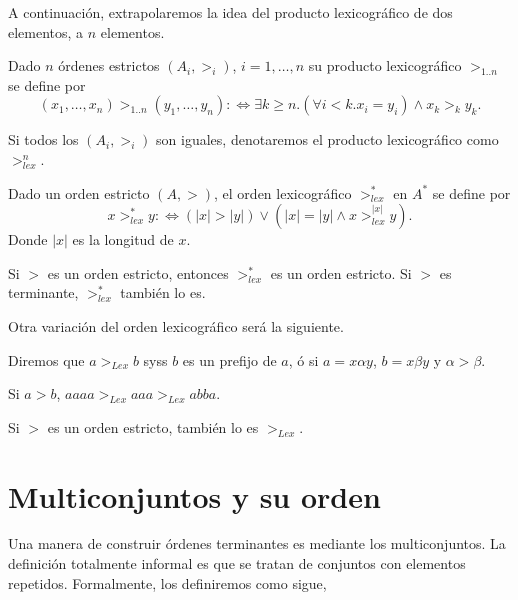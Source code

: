 A continuación, extrapolaremos la idea del producto lexicográfico de dos
elementos, a $n$ elementos.

\begin{defi}
  Dado $n$ órdenes estrictos $(A_i,>_i)$, $i=1,\dots,n$ su producto
  lexicográfico $>_{1..n}$ se define por
  \[(x_1,\dots,x_n) >_{1..n}  (y_1,\dots,y_n) :\Leftrightarrow 
    \exists k \geq n. (\forall i < k. x_i = y_i) \wedge x_k >_k y_k.\]
\end{defi} 

\begin{nota} 
  Si todos los $(A_i,>_i)$ son iguales, denotaremos el producto lexicográfico
  como $>^n_{lex}$.
\end{nota}


\begin{defi}
  Dado un orden estricto $(A,>)$, el orden lexicográfico $>^*_{lex}$ en $A^*$
  se define por
  \[x >^*_{lex} y :\Leftrightarrow (|x| > |y|) \vee (|x| = |y| \wedge x >^{|x|}_{lex} y).\]
  Donde $|x|$ es la longitud de $x$.
\end{defi} 

\begin{lema}
  Si $>$ es un orden estricto, entonces $>^*_{lex}$ es un orden estricto. Si $>$ es
  terminante, $>^*_{lex}$ también lo es.
\end{lema}

Otra variación del orden lexicográfico será la siguiente.

\begin{defi}
  Diremos que $a >_{Lex} b$ syss $b$ es un prefijo de $a$, ó si
  $a = x \alpha y$, $b = x \beta y$ y $\alpha > \beta$.
\end{defi}

\begin{ejem}
  Si $a>b$, $aaaa >_{Lex} aaa >_{Lex} abba$.
\end{ejem}

\begin{lema}
  Si $>$ es un orden estricto, también lo es $>_{Lex}$.
\end{lema}

\section{Multiconjuntos y su orden}\label{ormult}

Una manera de construir órdenes terminantes es mediante los multiconjuntos. La
definición totalmente informal es que se tratan de conjuntos con elementos
repetidos. Formalmente, los definiremos como sigue,

